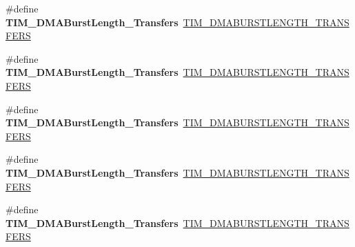 \begin{DoxyCompactItemize}
\mbox{\label{group___h_a_l___t_i_m___aliased___defines_ga84bfeb309593a1ac580e233bf7514b36}} 
\#define {\bfseries T\+I\+M\+\_\+\+D\+M\+A\+Burst\+Length\+\_\+Transfers}~\mbox{\hyperlink{group___t_i_m___d_m_a___burst___length_ga9ada9605ae6ff6e4ada9701263bef812}{T\+I\+M\+\_\+\+D\+M\+A\+B\+U\+R\+S\+T\+L\+E\+N\+G\+T\+H\+\_\+T\+R\+A\+N\+S\+F\+E\+RS}}
\item 
\mbox{\label{group___h_a_l___t_i_m___aliased___defines_ga44f8aa51fbe8887a5f3c37a0e776902c}} 
\#define {\bfseries T\+I\+M\+\_\+\+D\+M\+A\+Burst\+Length\+\_\+Transfers}~\mbox{\hyperlink{group___t_i_m___d_m_a___burst___length_ga740a6446c0a517cc3e235fddee45fef5}{T\+I\+M\+\_\+\+D\+M\+A\+B\+U\+R\+S\+T\+L\+E\+N\+G\+T\+H\+\_\+T\+R\+A\+N\+S\+F\+E\+RS}}
\item 
\mbox{\label{group___h_a_l___t_i_m___aliased___defines_ga8be40a21654eea72e9c1bf9922675b22}} 
\#define {\bfseries T\+I\+M\+\_\+\+D\+M\+A\+Burst\+Length\+\_\+Transfers}~\mbox{\hyperlink{group___t_i_m___d_m_a___burst___length_ga905c206d2a028e3fb92bcab8f9f7c869}{T\+I\+M\+\_\+\+D\+M\+A\+B\+U\+R\+S\+T\+L\+E\+N\+G\+T\+H\+\_\+T\+R\+A\+N\+S\+F\+E\+RS}}
\item 
\mbox{\label{group___h_a_l___t_i_m___aliased___defines_gaf2ae83bd73b0e92b73e5ebfc11f9bfad}} 
\#define {\bfseries T\+I\+M\+\_\+\+D\+M\+A\+Burst\+Length\+\_\+Transfers}~\mbox{\hyperlink{group___t_i_m___d_m_a___burst___length_gae75055ac13b73baf9326f1d6157853a7}{T\+I\+M\+\_\+\+D\+M\+A\+B\+U\+R\+S\+T\+L\+E\+N\+G\+T\+H\+\_\+T\+R\+A\+N\+S\+F\+E\+RS}}
\item 
\mbox{\label{group___h_a_l___t_i_m___aliased___defines_ga8a760d7114425596736b0ecdbe5fdea6}} 
\#define {\bfseries T\+I\+M\+\_\+\+D\+M\+A\+Burst\+Length\+\_\+Transfers}~\mbox{\hyperlink{group___t_i_m___d_m_a___burst___length_gac6b24f5b7d9e1968b4bfcaeb24e718fc}{T\+I\+M\+\_\+\+D\+M\+A\+B\+U\+R\+S\+T\+L\+E\+N\+G\+T\+H\+\_\+T\+R\+A\+N\+S\+F\+E\+RS}}
\item 
\mbox{\label{group___h_a_l___t_i_m___aliased___defines_ga98b208205c133557a9d67a0921559a66}} 

\end{DoxyCompactItemize}
